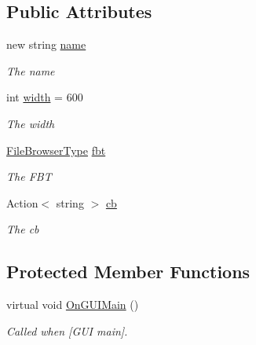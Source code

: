 \subsection*{Public Attributes}
\begin{DoxyCompactItemize}
\item 
new string \hyperlink{class_lerp2_a_p_i_editor_1_1_editor_windows_1_1_browser_window_a75b5971be0804cdeba338f4a019682b3}{name}
\begin{DoxyCompactList}\small\item\em The name \end{DoxyCompactList}\item 
int \hyperlink{class_lerp2_a_p_i_editor_1_1_editor_windows_1_1_browser_window_ae39ade89001edd898154cc3b7c038317}{width} = 600
\begin{DoxyCompactList}\small\item\em The width \end{DoxyCompactList}\item 
\hyperlink{namespace_lerp2_a_p_i_1_1_utility_af5d628470963cc0f18c37055b4170bf1}{File\+Browser\+Type} \hyperlink{class_lerp2_a_p_i_editor_1_1_editor_windows_1_1_browser_window_a9d36b245adda6d3c118f7132035619b5}{fbt}
\begin{DoxyCompactList}\small\item\em The F\+BT \end{DoxyCompactList}\item 
Action$<$ string $>$ \hyperlink{class_lerp2_a_p_i_editor_1_1_editor_windows_1_1_browser_window_a442a9bc66b634f38b58c4dabeb9fab38}{cb}
\begin{DoxyCompactList}\small\item\em The cb \end{DoxyCompactList}\end{DoxyCompactItemize}
\subsection*{Protected Member Functions}
\begin{DoxyCompactItemize}
\item 
virtual void \hyperlink{class_lerp2_a_p_i_editor_1_1_editor_windows_1_1_browser_window_a1139c5e7eff7088651430deab884b9ed}{On\+G\+U\+I\+Main} ()
\begin{DoxyCompactList}\small\item\em Called when \mbox{[}G\+UI main\mbox{]}. \end{DoxyCompactList}\end{DoxyCompactItemize}


